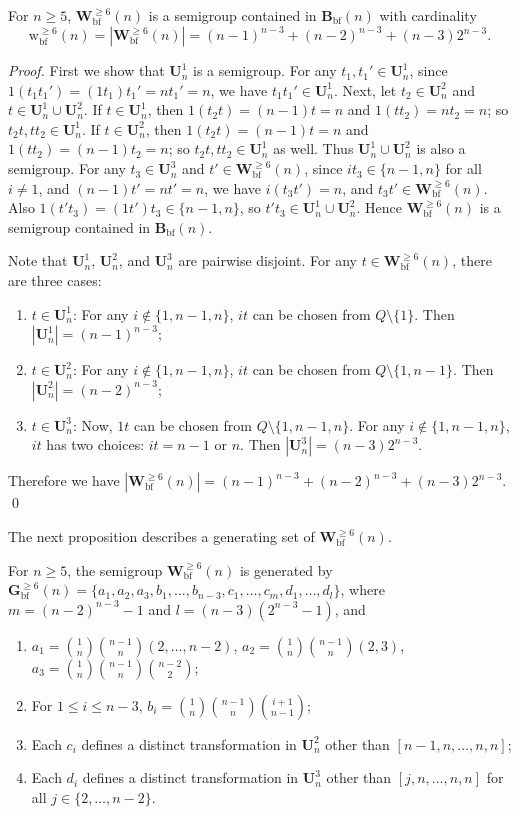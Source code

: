 \documentclass{llncs}
\renewcommand{\le}{\leqslant}
\renewcommand{\ge}{\geqslant}
\newcommand{\be}{\begin{enumerate}}
\newcommand{\ee}{\end{enumerate}}
\newcommand{\Bbf}{\mathbf{B}_{\mathrm{bf}}}
\newcommand{\Wbf}{\mathbf{W}^{\ge 6}_{\mathrm{bf}}}
\newcommand{\Hbf}{\mathbf{G}^{\ge 6}_{\mathrm{bf}}}
\newcommand{\Uf}{\mathbf{U}}
\newcommand{\wbf}{{\mathrm{w}^{\ge 6}_{\mathrm{bf}}}}
\begin{document}
\begin{proposition}\label{prop:Rcard} 
For $n \ge 5$, $\Wbf(n)$ is a semigroup contained in $\Bbf(n)$ with cardinality 
$$ \wbf(n) = |\Wbf(n)| = (n-1)^{n-3} + (n-2)^{n-3} + (n-3)2^{n-3}. $$
\end{proposition}

\begin{proof} 

First we show that $\Uf^1_n$ is a semigroup. For any $t_1,t_1' \in \Uf^1_n$, since $1(t_1t_1') = (1t_1)t_1' = nt_1' = n$, we have $t_1t_1' \in \Uf^1_n$. Next, let $t_2 \in \Uf^2_n$ and $t \in \Uf^1_n \cup \Uf^2_n$. If $t \in \Uf^1_n$, then $1(t_2t) = (n-1)t = n$ and $1(tt_2) = nt_2 = n$; so $t_2t, tt_2 \in \Uf^1_n$. If $t \in \Uf^2_n$, then $1(t_2t) = (n-1)t = n$ and $1(tt_2) = (n-1)t_2 = n$; so $t_2t, tt_2 \in \Uf^1_n$ as well. Thus $\Uf^1_n \cup \Uf^2_n$ is also a semigroup. For any $t_3 \in \Uf^3_n$ and $t' \in \Wbf(n)$, since $it_3 \in \{n-1,n\}$ for all $i \neq 1$, and $(n-1)t' = nt' = n$, we have $i(t_3t') = n$, and $t_3t' \in \Wbf(n)$. Also $1(t't_3) = (1t')t_3 \in \{n-1,n\}$, so $t't_3 \in \Uf^1_n \cup \Uf^2_n$. Hence $\Wbf(n)$ is a semigroup contained in $\Bbf(n)$. 


Note that $\Uf^1_n$, $\Uf^2_n$, and $\Uf^3_n$ are pairwise disjoint. For any $t \in \Wbf(n)$, there are three cases: 

\be
\item $t \in \Uf^1_n$: For any $i \not\in \{1,n-1,n\}$, $it$ can be chosen from $Q \setminus \{1\}$. Then $|\Uf^1_n| = (n-1)^{n-3}$; 
\item $t \in \Uf^2_n$: For any $i \not\in \{1,n-1,n\}$, $it$ can be chosen from $Q \setminus \{1,n-1\}$. Then $|\Uf^2_n| = (n-2)^{n-3}$; 
\item $t \in \Uf^3_n$: Now, $1t$ can be chosen from $Q \setminus \{1,n-1,n\}$. For any $i \not\in \{1,n-1,n\}$, $it$ has two choices: $it = n-1$ or $n$. Then $|\Uf^3_n| = (n-3)2^{n-3}$. 
\ee 
Therefore we have $|\Wbf(n)| = (n-1)^{n-3} + (n-2)^{n-3} + (n-3)2^{n-3}$. \qed
\end{proof}

The next proposition describes a generating set of $\Wbf(n)$. 
\begin{proposition}\label{prop:Rgen} 
For $n \ge 5$, the semigroup $\Wbf(n)$ is generated by $\Hbf(n) = \{a_1, a_2, a_3, b_1, \ldots, b_{n-3}, c_1, \ldots, c_m, d_1, \ldots, d_l\}$, where $m = (n-2)^{n-3}-1$ and $l = (n-3)(2^{n-3} - 1)$, and 
\be
\item $a_1 = {1 \choose n}{n-1 \choose n}(2,\ldots,n-2)$, $a_2 = {1 \choose n}{n-1 \choose n}(2,3)$, $a_3 = {1 \choose n}{n-1 \choose n}{n-2 \choose 2}$; 
\item For $1 \le i \le n-3$, $b_i = {1 \choose n}{n-1 \choose n}{i+1 \choose n-1}$; 
\item Each $c_i$ defines a distinct transformation in $\Uf^2_n$ other than $[n-1,n,\ldots,n,n]$; 
\item Each $d_i$ defines a distinct transformation in $\Uf^3_n$ other than $[j,n,\ldots,n,n]$ for all $j \in \{2,\ldots,n-2\}$. 
\ee
\end{proposition}
\end{document}

